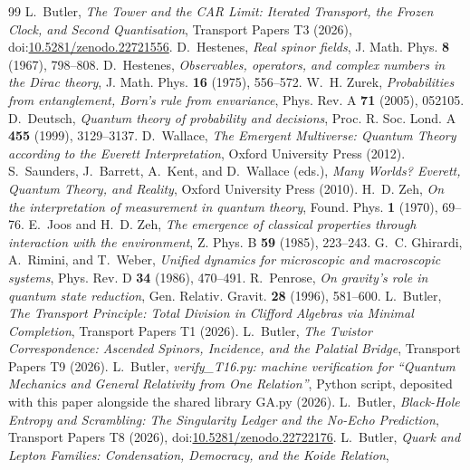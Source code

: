 \documentclass[11pt]{article}
\theoremstyle{definition}
\theoremstyle{plain}
\begin{document}
\begin{thebibliography}{99}
 L.~Butler,
\emph{The Tower and the CAR Limit: Iterated Transport, the Frozen Clock, and Second Quantisation},
Transport Papers T3 (2026), doi:\href{https://doi.org/10.5281/zenodo.22721556}{10.5281/zenodo.22721556}.
 D.~Hestenes,
\emph{Real spinor fields},
J. Math. Phys. \textbf{8} (1967), 798--808.
 D.~Hestenes,
\emph{Observables, operators, and complex numbers in the Dirac theory},
J. Math. Phys. \textbf{16} (1975), 556--572.
 W.~H. Zurek,
\emph{Probabilities from entanglement, Born's rule from envariance},
Phys. Rev. A \textbf{71} (2005), 052105.
 D.~Deutsch,
\emph{Quantum theory of probability and decisions},
Proc. R. Soc. Lond. A \textbf{455} (1999), 3129--3137.
 D.~Wallace,
\emph{The Emergent Multiverse: Quantum Theory according to the Everett Interpretation},
Oxford University Press (2012).
 S.~Saunders, J.~Barrett, A.~Kent, and D.~Wallace (eds.),
\emph{Many Worlds? Everett, Quantum Theory, and Reality},
Oxford University Press (2010).
 H.~D. Zeh,
\emph{On the interpretation of measurement in quantum theory},
Found. Phys. \textbf{1} (1970), 69--76.
 E.~Joos and H.~D. Zeh,
\emph{The emergence of classical properties through interaction with the environment},
Z. Phys. B \textbf{59} (1985), 223--243.
 G.~C. Ghirardi, A.~Rimini, and T.~Weber,
\emph{Unified dynamics for microscopic and macroscopic systems},
Phys. Rev. D \textbf{34} (1986), 470--491.
 R.~Penrose,
\emph{On gravity's role in quantum state reduction},
Gen. Relativ. Gravit. \textbf{28} (1996), 581--600.
 L.~Butler,
\emph{The Transport Principle: Total Division in Clifford Algebras via Minimal Completion},
Transport Papers T1 (2026).
 L.~Butler,
\emph{The Twistor Correspondence: Ascended Spinors, Incidence, and the Palatial Bridge},
Transport Papers T9 (2026).
 L.~Butler,
\emph{verify\_T16.py: machine verification for ``Quantum Mechanics and General Relativity from One Relation''},
Python script, deposited with this paper alongside the shared library GA.py (2026).
 L.~Butler,
\emph{Black-Hole Entropy and Scrambling: The Singularity Ledger and the No-Echo Prediction},
Transport Papers T8 (2026), doi:\href{https://doi.org/10.5281/zenodo.22722176}{10.5281/zenodo.22722176}.
 L.~Butler,
\emph{Quark and Lepton Families: Condensation, Democracy, and the Koide Relation},

\end{thebibliography}
\end{document}
